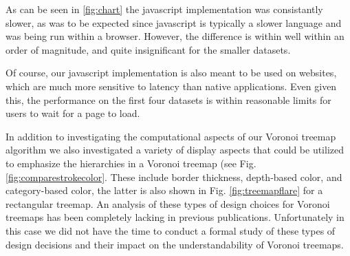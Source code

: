 \documentclass{acm_proc_article-sp} \usepackage{cite}
\begin{document}
As can be seen in \ref{fig:chart} the javascript implementation was
consistantly slower, as was to be expected since javascript is
typically a slower language and was being run within a
browser. However, the difference is within well within an order of
magnitude, and quite insignificant for the smaller datasets.

Of course, our javascript implementation is also meant to be used on
websites, which are much more sensitive to latency than native
applications. Even given this, the performance on the first four
datasets is within reasonable limits for users to wait for a page to
load.

In addition to investigating the computational aspects of our Voronoi
treemap algorithm we also investigated a variety of display aspects
that could be utilized to emphasize the hierarchies in a Voronoi
treemap (see Fig. \ref{fig:comparestrokecolor}. These include border
thickness, depth-based color, and category-based color, the latter is
also shown in Fig. \ref{fig:treemapflare} for a rectangular
treemap. An analysis of these types of design choices for Voronoi
treemaps has been completely lacking in previous
publications. Unfortunately in this case we did not have the time to
conduct a formal study of these types of design decisions and their
impact on the understandability of Voronoi treemaps.

\end{document}
